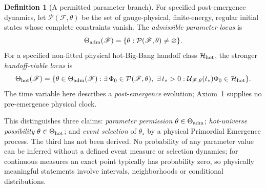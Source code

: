 \documentclass[11pt,a4paper]{article}
\theoremstyle{tmon}
\theoremstyle{definition}
\newtheorem{definition}[theorem]{Definition}
\begin{document}
\begin{definition}[A permitted parameter branch]\label{def:c001}
For specified post-emergence dynamics, let $\mathcal P(\mathscr F,\theta)$ be the set of gauge-physical, finite-energy, regular initial states whose complete constraints vanish. The \emph{admissible parameter locus} is
\[
\Theta_{\rm adm}(\mathscr F)=\{\theta:\mathcal P(\mathscr F,\theta)\ne\varnothing\}.
\]
For a specified non-fitted physical hot-Big-Bang handoff class $\mathcal H_{\rm hot}$, the stronger \emph{handoff-viable locus} is
\begin{equation}\label{eq:c001viable}
\Theta_{\rm hot}(\mathscr F)=\{\theta\in\Theta_{\rm adm}(\mathscr F):\exists\,\Phi_0\in\mathcal P(\mathscr F,\theta),\ \exists\,t_*>0:\mathcal U_{\mathscr F,\theta}(t_*)\Phi_0\in\mathcal H_{\rm hot}\}.
\end{equation}
The time variable here describes a \emph{post-emergence} evolution; Axiom~1 supplies no pre-emergence physical clock.
\end{definition}

This distinguishes three claims: \emph{parameter permission} $\theta\in\Theta_{\rm adm}$; \emph{hot-universe possibility} $\theta\in\Theta_{\rm hot}$; and \emph{event selection} of $\theta_\star$ by a physical Primordial Emergence process. The third has not been derived. No probability of any parameter value can be inferred without a defined event measure or selection dynamics; for continuous measures an exact point typically has probability zero, so physically meaningful statements involve intervals, neighborhoods or conditional distributions.
\end{document}
